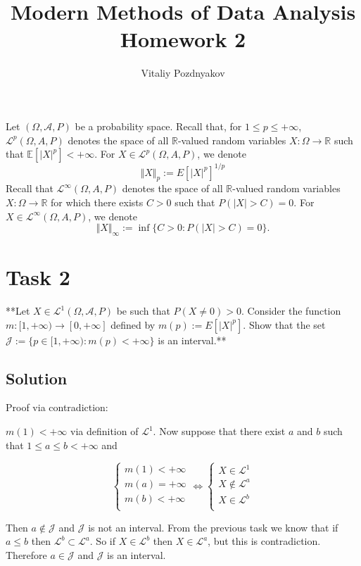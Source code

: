 \documentclass{article}
\title{Modern Methods of Data Analysis \\ Homework 2}
\author{Vitaliy Pozdnyakov}
\date{}
\begin{document}
\maketitle

Let $(\Omega, \mathcal A, P)$ be a probability space. Recall that, for $1 \leq p \leq +\infty$, $\mathcal L^p(\Omega,A,P)$ denotes the space of all $\mathbb R$-valued random variables $X : \Omega \to \mathbb R$ such that $\mathbb E[|X|^p] < +\infty$. For $X \in \mathcal L^p(\Omega,A,P)$, we denote
$$ \Vert X \Vert_p :=E[|X|^p]^{1/p}$$
Recall that $\mathcal L^{\infty}(\Omega,A,P)$ denotes the space of all $\mathbb R$-valued random variables $X : \Omega \to \mathbb R$ for which there exists $C > 0$ such that $P(|X| > C) = 0$. For $X \in \mathcal L^\infty(\Omega,A,P)$, we denote
$$\Vert X \Vert_\infty := \inf\{C >0:P(|X|>C)=0\}.$$

\section*{Task 2}

**Let $X \in \mathcal L^1 (\Omega, \mathcal A, P)$ be such that $P(X \neq 0) > 0$. Consider the function $m : [1, +\infty) \to [0, +\infty]$ defined by $m(p) := E[|X|^p]$. Show that the set $\mathcal J := \{p \in [1, +\infty) : m(p) < +\infty\}$ is an interval.**

\subsection*{Solution}

Proof via contradiction:

$m(1) < +\infty$ via definition of $\mathcal L^1$. Now suppose that there exist $a$ and $b$ such that $1 \leq a \leq b < +\infty$ and

$$\begin{cases}
m(1) < +\infty \\
m(a) = +\infty \\
m(b) < +\infty \\
\end{cases}
\Leftrightarrow
\begin{cases}
X \in \mathcal L^1 \\
X \notin \mathcal L^a \\
X \in \mathcal L^b \\
\end{cases}$$

Then $a \notin \mathcal J$ and $\mathcal J$ is not an interval. From the previous task we know that if $a \leq b$ then $\mathcal L^b \subset \mathcal L^a$. So if $X \in \mathcal L^b$ then $X \in \mathcal L^a$, but this is contradiction. Therefore $a \in \mathcal J$ and $\mathcal J$ is an interval.
\end{document}
